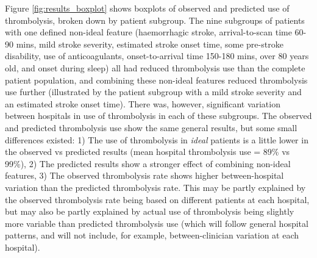 Figure \ref{fig:results_boxplot} shows boxplots of observed and predicted use of thrombolysis, broken down by patient subgroup. The nine subgroups of patients with one defined non-ideal feature (haemorrhagic stroke, arrival-to-scan time 60-90 mins, mild stroke severity, estimated stroke onset time, some pre-stroke disability, use of anticoagulants, onset-to-arrival time 150-180 mins, over 80 years old, and onset during sleep) all had reduced thrombolysis use than the complete patient population, and combining these non-ideal features reduced thrombolysis use further (illustrated by the patient subgroup with a mild stroke severity and an estimated stroke onset time). There was, however, significant variation between hospitals in use of thrombolysis in each of these subgroups. The observed and predicted thrombolysis use show the same general results, but some small differences existed: 1) The use of thrombolysis in \emph{ideal} patients is a little lower in the observed vs predicted results (mean hospital thrombolysis use = 89\% vs 99\%), 2) The predicted results show a stronger effect of combining non-ideal features, 3) The observed thrombolysis rate shows higher between-hospital variation than the predicted thrombolysis rate. This may be partly explained by the observed thrombolysis rate being based on different patients at each hospital, but may also be partly explained by actual use of thrombolysis being slightly more variable than predicted thrombolysis use (which will follow general hospital patterns, and will not include, for example, between-clinician variation at each hospital).

